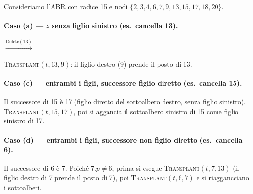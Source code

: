 \begin{esempio}
	Consideriamo l'ABR con radice 15 e nodi
	$\{2,3,4,6,7,9,13,15,17,18,20\}$.
	
	\paragraph{Caso (a) — $z$ senza figlio sinistro (es.\ cancella 13).}
	\begin{center}
		\quad$\xrightarrow{\text{Delete}(13)}$\quad
	\end{center}
	\textsc{Transplant}$(t, 13, 9)$: il figlio destro (9) prende il posto di 13.
	
	\paragraph{Caso (c) — entrambi i figli, successore figlio diretto (es.\ cancella 15).}
	Il successore di 15 è 17 (figlio diretto del sottoalbero destro, senza figlio
	sinistro). \textsc{Transplant}$(t, 15, 17)$, poi si aggancia il sottoalbero
	sinistro di 15 come figlio sinistro di 17.
	
	\paragraph{Caso (d) — entrambi i figli, successore non figlio diretto (es.\ cancella 6).}
	Il successore di 6 è 7. Poiché $7.p \neq 6$, prima si esegue
	\textsc{Transplant}$(t, 7, 13)$ (il figlio destro di 7 prende il posto di 7),
	poi \textsc{Transplant}$(t, 6, 7)$ e si riaggancciano i sottoalberi.
\end{esempio}

